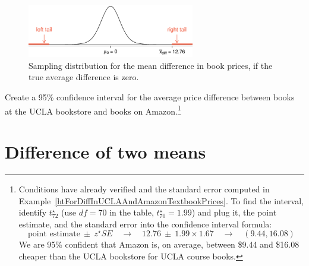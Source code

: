 \begin{figure}[h]
\centering
\includegraphics[width=0.65\textwidth]{ch_inference_for_means/figures/textbooksS10/textbooksS10HTTails}
\caption{Sampling distribution for the mean difference in book prices, if the true average difference is zero.}
\label{textbooksS10HTTails}
\end{figure}

\begin{exercise}
Create a 95\% confidence interval for the average price difference between books at the UCLA bookstore and books on Amazon.\footnote{Conditions have already verified and the standard error computed in Example~\ref{htForDiffInUCLAAndAmazonTextbookPrices}. To find the interval, identify $t^{\star}_{72}$ (use $df=70$ in the table, $t^{\star}_{70} = 1.99$) and plug it, the point estimate, and the standard error into the confidence interval formula:
$$\text{point estimate} \ \pm\ z^{\star}SE \quad\to\quad 12.76 \ \pm\ 1.99\times 1.67 \quad\to\quad (9.44, 16.08)$$
We are 95\% confident that Amazon is, on average, between \$9.44 and \$16.08 cheaper than the UCLA bookstore for UCLA course books.}


\end{exercise}



\section{Difference of two means}
\label{differenceOfTwoMeans}

